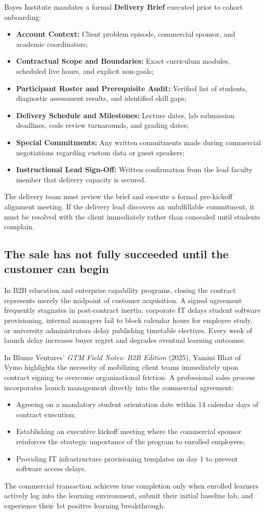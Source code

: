 Bayes Institute mandates a formal \textbf{Delivery Brief} executed prior to cohort onboarding:
\begin{itemize}
\item \textbf{Account Context:} Client problem episode, commercial sponsor, and academic coordinators;
\item \textbf{Contractual Scope and Boundaries:} Exact curriculum modules, scheduled live hours, and explicit non-goals;
\item \textbf{Participant Roster and Prerequisite Audit:} Verified list of students, diagnostic assessment results, and identified skill gaps;
\item \textbf{Delivery Schedule and Milestones:} Lecture dates, lab submission deadlines, code review turnarounds, and grading dates;
\item \textbf{Special Commitments:} Any written commitments made during commercial negotiations regarding custom data or guest speakers;
\item \textbf{Instructional Lead Sign-Off:} Written confirmation from the lead faculty member that delivery capacity is secured.
\end{itemize}
The delivery team must review the brief and execute a formal pre-kickoff alignment meeting. If the delivery lead discovers an unfulfillable commitment, it must be resolved with the client immediately rather than concealed until students complain.

\subsection{The sale has not fully succeeded until the customer can begin}

In B2B education and enterprise capability programs, closing the contract represents merely the midpoint of customer acquisition. A signed agreement frequently stagnates in post-contract inertia: corporate IT delays student software provisioning, internal managers fail to block calendar hours for employee study, or university administrators delay publishing timetable electives. Every week of launch delay increases buyer regret and degrades eventual learning outcomes.

In Blume Ventures' \textit{GTM Field Notes: B2B Edition} (2025), Yamini Bhat of Vymo highlights the necessity of mobilizing client teams immediately upon contract signing to overcome organizational friction. A professional sales process incorporates launch management directly into the commercial agreement:
\begin{itemize}
\item Agreeing on a mandatory student orientation date within 14 calendar days of contract execution;
\item Establishing an executive kickoff meeting where the commercial sponsor reinforces the strategic importance of the program to enrolled employees;
\item Providing IT infrastructure provisioning templates on day 1 to prevent software access delays.
\end{itemize}
The commercial transaction achieves true completion only when enrolled learners actively log into the learning environment, submit their initial baseline lab, and experience their 1st positive learning breakthrough.
